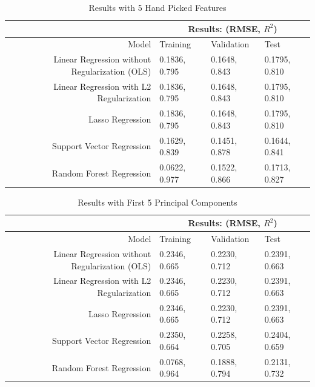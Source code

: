 \documentclass[a4paper]{article}
\begin{document}
\begin{table}[H]
\centering
\caption{\large Results with 5 Hand Picked Features}
\vspace{0.3cm}
\begin{tabular}{| r | p{2cm} | p{2cm} | p{2cm} |}
\hline
 & \multicolumn{3}{|c|}{Results: (RMSE, $R^2$)} \\
\hline
Model & Training & Validation & Test \\
\hline
Linear Regression without Regularization (OLS) & 0.1836, 0.795 & 0.1648, 0.843 & 0.1795, 0.810 \\
\hline
Linear Regression with L2 Regularization & 0.1836, 0.795 & 0.1648, 0.843 & 0.1795, 0.810 \\
\hline
Lasso Regression & 0.1836, 0.795 & 0.1648, 0.843 & 0.1795, 0.810 \\
\hline
Support Vector Regression & 0.1629, 0.839 & 0.1451, 0.878 & 0.1644, 0.841 \\
\hline
Random Forest Regression & 0.0622, 0.977 & 0.1522, 0.866 & 0.1713, 0.827 \\
\hline
\end{tabular}
\end{table}

\begin{table}[H]
\centering
\caption{\large Results with First 5 Principal Components}
\vspace{0.3cm}
\begin{tabular}{| r | p{2cm} | p{2cm} | p{2cm} |}
\hline
 & \multicolumn{3}{|c|}{Results: (RMSE, $R^2$)} \\
\hline
Model & Training & Validation & Test \\
\hline
Linear Regression without Regularization (OLS) & 0.2346, 0.665 & 0.2230, 0.712 & 0.2391, 0.663 \\
\hline
Linear Regression with L2 Regularization & 0.2346, 0.665 & 0.2230, 0.712 & 0.2391, 0.663 \\
\hline
Lasso Regression & 0.2346, 0.665 & 0.2230, 0.712 & 0.2391, 0.663 \\
\hline
Support Vector Regression & 0.2350, 0.664 & 0.2258, 0.705 & 0.2404, 0.659 \\
\hline
Random Forest Regression & 0.0768, 0.964 & 0.1888, 0.794 & 0.2131, 0.732 \\
\hline
\end{tabular}
\end{table}
\end{document}
